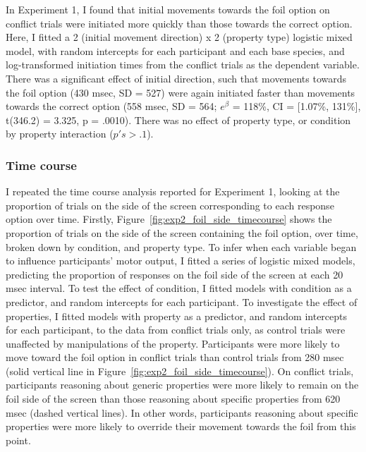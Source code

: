 In Experiment 1, I found that initial movements towards the foil option on conflict trials
were initiated more quickly than those towards the correct option.
Here, I fitted a 2 (initial movement direction) x 2 (property type) logistic mixed model,
with random intercepts for each participant and each base species,
and log-transformed initiation times from the conflict trials as the dependent variable.
There was a significant effect of initial direction,
such that movements towards the foil option (430 msec, SD = 527)
were again initiated faster than movements towards the correct option (558 msec, SD = 564;
$e^{\beta}$ = 118\%, CI = [1.07\%, 131\%], t(346.2) = 3.325, p = .0010).
There was no effect of property type, or condition by property interaction ($p's > .1$).


\subsubsection{Time course}

I repeated the time course analysis reported for Experiment 1,
looking at the proportion of trials on the side of the screen
corresponding to each response option over time.
Firstly, Figure~\ref{fig:exp2_foil_side_timecourse}
shows the proportion of trials on the side of the screen
containing the foil option, over time,
broken down by condition, and property type.
To infer when each variable began to influence participants' motor output,
I fitted a series of logistic mixed models,
predicting the proportion of responses on the foil side of the screen
at each 20 msec interval.
To test the effect of condition, I fitted models
with condition as a predictor, and random intercepts for each participant.
To investigate the effect of properties,
I fitted models with property as a predictor, and random intercepts for each participant,
to the data from conflict trials only,
as control trials were unaffected by manipulations of the property.
Participants were more likely to
move toward the foil option in conflict trials than control trials from 280 msec
(solid vertical line in Figure~\ref{fig:exp2_foil_side_timecourse}).
On conflict trials, participants reasoning about generic properties
were more likely to remain on the foil side of the screen than those 
reasoning about specific properties from 620 msec (dashed vertical lines).
In other words, participants reasoning about specific properties
were more likely to override their movement towards the foil from this point.


